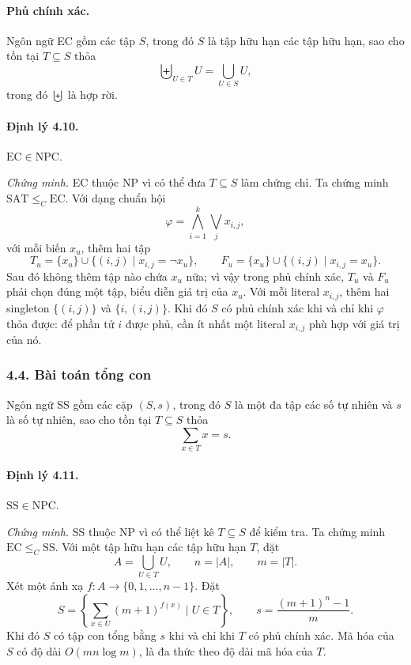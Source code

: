 \documentclass[11pt]{article}
\begin{document}
\paragraph{Phủ chính xác.}
Ngôn ngữ EC gồm các tập \(S\), trong đó \(S\) là tập hữu hạn các tập hữu hạn,
sao cho tồn tại \(T\subseteq S\) thỏa
\[
  \biguplus_{U\in T}U=\bigcup_{U\in S}U,
\]
trong đó \(\biguplus\) là hợp rời.

\paragraph{Định lý 4.10.}
\(\mathrm{EC}\in\mathrm{NPC}\).

\emph{Chứng minh.}
EC thuộc NP vì có thể đưa \(T\subseteq S\) làm chứng chỉ. Ta chứng minh
\(\mathrm{SAT}\le_C\mathrm{EC}\). Với dạng chuẩn hội
\[
  \varphi=\bigwedge_{i=1}^{k}\bigvee_j x_{i,j},
\]
với mỗi biến \(x_u\), thêm hai tập
\[
  T_u=\{x_u\}\cup\{(i,j)\mid x_{i,j}=\neg x_u\},\qquad
  F_u=\{x_u\}\cup\{(i,j)\mid x_{i,j}=x_u\}.
\]
Sau đó không thêm tập nào chứa \(x_u\) nữa; vì vậy trong phủ chính xác, \(T_u\)
và \(F_u\) phải chọn đúng một tập, biểu diễn giá trị của \(x_u\). Với mỗi
literal \(x_{i,j}\), thêm hai singleton \(\{(i,j)\}\) và \(\{i,(i,j)\}\). Khi
đó \(S\) có phủ chính xác khi và chỉ khi \(\varphi\) thỏa được: để phần tử
\(i\) được phủ, cần ít nhất một literal \(x_{i,j}\) phù hợp với giá trị của nó.

\subsubsection*{4.4. Bài toán tổng con}

Ngôn ngữ SS gồm các cặp \((S,s)\), trong đó \(S\) là một đa tập các số tự nhiên
và \(s\) là số tự nhiên, sao cho tồn tại \(T\subseteq S\) thỏa
\[
  \sum_{x\in T}x=s.
\]

\paragraph{Định lý 4.11.}
\(\mathrm{SS}\in\mathrm{NPC}\).

\emph{Chứng minh.}
SS thuộc NP vì có thể liệt kê \(T\subseteq S\) để kiểm tra. Ta chứng minh
\(\mathrm{EC}\le_C\mathrm{SS}\). Với một tập hữu hạn các tập hữu hạn \(T\), đặt
\[
  A=\bigcup_{U\in T}U,\qquad n=|A|,\qquad m=|T|.
\]
Xét một ánh xạ \(f:A\to\{0,1,\ldots,n-1\}\). Đặt
\[
  S=\left\{\sum_{x\in U}(m+1)^{f(x)}\mid U\in T\right\},\qquad
  s=\frac{(m+1)^n-1}{m}.
\]
Khi đó \(S\) có tập con tổng bằng \(s\) khi và chỉ khi \(T\) có phủ chính xác.
Mã hóa của \(S\) có độ dài \(O(mn\log m)\), là đa thức theo độ dài mã hóa của
\(T\).
\end{document}
